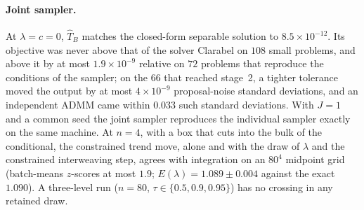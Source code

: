 \paragraph{Joint sampler.} At $\lambda = c = 0$, $\widehat T_B$ matches the closed-form separable solution to $8.5\times10^{-12}$. Its objective was never above that of the solver Clarabel \citep{goulart2024clarabel} on $108$ small problems, and above it by at most $1.9\times10^{-9}$ relative on $72$ problems that reproduce the conditions of the sampler; on the $66$ that reached stage~2, a tighter tolerance moved the output by at most $4\times10^{-9}$ proposal-noise standard deviations, and an independent ADMM came within $0.033$ such standard deviations. With $J = 1$ and a common seed the joint sampler reproduces the individual sampler exactly on the same machine. At $n = 4$, with a box that cuts into the bulk of the conditional, the constrained trend move, alone and with the draw of $\lambda$ and the constrained interweaving step, agrees with integration on an $80^4$ midpoint grid (batch-means $z$-scores at most $1.9$; $E(\lambda) = 1.089 \pm 0.004$ against the exact $1.090$). A three-level run ($n = 80$, $\tau \in \{0.5, 0.9, 0.95\}$) has no crossing in any retained draw.
